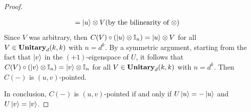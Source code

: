 \begin{proof}
\begin{itemize}
\begin{align*}
              =
              \ket{u} \otimes V
              &
              ( \text{by the bilinearity of } \otimes )
          \end{align*}
          Since $V$ was arbitrary, then $C( V ) \circ ( \ket{u} \otimes \mathbb{I}_n ) = \ket{u} \otimes V$ for all $V \in \mathbf{Unitary}_d( k, k )$ with $n = d^k$.
          By a symmetric argument, starting from the fact that $\ket{v}$ in the $(+1)$-eigenspace of $U$, it follows that $C( V ) \circ ( \ket{v} \otimes \mathbb{I}_n ) = \ket{v} \otimes \mathbb{I}_n$ for all $V \in \mathbf{Unitary}_d( k, k )$ with $n = d^k$.
          Then $C( - )$ is $( u, v )$-pointed.
    \end{itemize}
    In conclusion, $C( - )$ is $( u, v )$-pointed if and only if $U\ket{u} = -\ket{u}$ and $U\ket{v} = \ket{v}$.
\end{proof}